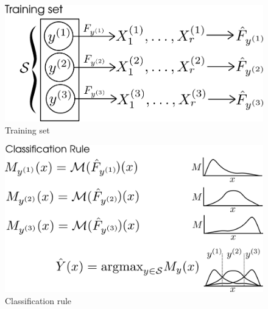 \documentclass[12pt]{article}
\begin{document}



\begin{figure}[h]
\centering
\includegraphics[scale = 0.4]{extrapolation_figures/training_set.png}
\caption{Training set}\label{fig:training_set}
\end{figure}

\begin{figure}[h]
\centering
\includegraphics[scale = 0.4]{extrapolation_figures/classification_rule.png}
\caption{Classification rule}\label{fig:classification_rule}
\end{figure}
\end{document}
